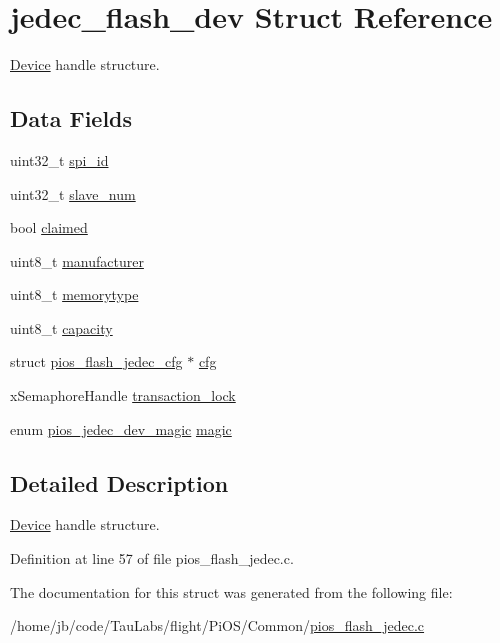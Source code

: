 \hypertarget{structjedec__flash__dev}{\section{jedec\-\_\-flash\-\_\-dev \-Struct \-Reference}
\label{structjedec__flash__dev}
}


\hyperlink{struct_device}{\-Device} handle structure.  


\subsection*{\-Data \-Fields}
\begin{DoxyCompactItemize}
\item 
uint32\-\_\-t \hyperlink{group___p_i_o_s___f_l_a_s_h_ga0f87de9cf831cf45ad2e81d4629cf021}{spi\-\_\-id}
\item 
uint32\-\_\-t \hyperlink{group___p_i_o_s___f_l_a_s_h_ga38ca35aafe78e6032326184768221fab}{slave\-\_\-num}
\item 
bool \hyperlink{group___p_i_o_s___f_l_a_s_h_ga0252ff9aa887c054e7299923b344bf59}{claimed}
\item 
uint8\-\_\-t \hyperlink{group___p_i_o_s___f_l_a_s_h_gaf7bb5593bcefe3837116c4bdb768cd6e}{manufacturer}
\item 
uint8\-\_\-t \hyperlink{group___p_i_o_s___f_l_a_s_h_ga68ce126b7f544ebb02fa8beab9b9faa2}{memorytype}
\item 
uint8\-\_\-t \hyperlink{group___p_i_o_s___f_l_a_s_h_ga4253b6dd4128fd223d200bed60696804}{capacity}
\item 
struct \hyperlink{structpios__flash__jedec__cfg}{pios\-\_\-flash\-\_\-jedec\-\_\-cfg} $\ast$ \hyperlink{group___p_i_o_s___f_l_a_s_h_ga26db753e18e085086b539aca2438ee45}{cfg}
\item 
x\-Semaphore\-Handle \hyperlink{group___p_i_o_s___f_l_a_s_h_ga28870637f7372faa2a3fb2bd887a4ab7}{transaction\-\_\-lock}
\item 
enum \hyperlink{group___p_i_o_s___f_l_a_s_h_ga3e7c01370e9757b84f3a37ec903714f3}{pios\-\_\-jedec\-\_\-dev\-\_\-magic} \hyperlink{group___p_i_o_s___f_l_a_s_h_gaf71b8f686812a43a77983b3ec807aed7}{magic}
\end{DoxyCompactItemize}


\subsection{\-Detailed \-Description}
\hyperlink{struct_device}{\-Device} handle structure. 

\-Definition at line 57 of file pios\-\_\-flash\-\_\-jedec.\-c.



\-The documentation for this struct was generated from the following file\-:\begin{DoxyCompactItemize}
\item 
/home/jb/code/\-Tau\-Labs/flight/\-Pi\-O\-S/\-Common/\hyperlink{pios__flash__jedec_8c}{pios\-\_\-flash\-\_\-jedec.\-c}\end{DoxyCompactItemize}
